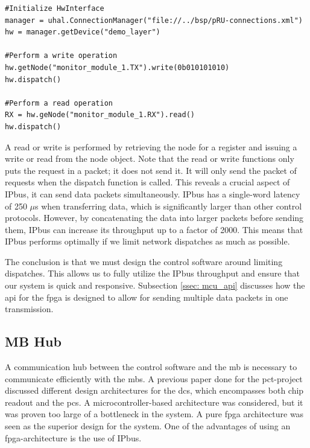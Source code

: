 \documentclass[main.tex]{subfiles}
\begin{document}
\begin{lstlisting}[caption={Example of setting up the HwInterface in python and using it to perform read and write operations.},captionpos=b, label=lst:hwinterface]
#Initialize HwInterface
manager = uhal.ConnectionManager("file://../bsp/pRU-connections.xml")
hw = manager.getDevice("demo_layer")

#Perform a write operation
hw.getNode("monitor_module_1.TX").write(0b010101010)
hw.dispatch()

#Perform a read operation
RX = hw.geNode("monitor_module_1.RX").read()
hw.dispatch()

    \end{lstlisting}



A read or write is performed by retrieving the node for a register and issuing a write or read from the node object. Note that the read or write functions only puts the request in a packet; it does not send it. It will only send the packet of requests when the dispatch function is called. This reveals a crucial aspect of IPbus, it can send data packets simultaneously. IPbus has a single-word latency of 250 $\mu$s when transferring data, which is significantly larger than other control protocols. However, by concatenating the data into larger packets before sending them, IPbus can increase its throughput up to a factor of 2000\cite{IPbus}. This means that IPbus performs optimally if we limit network dispatches as much as possible.

The conclusion is that we must design the control software around limiting dispatches. This allows us to fully utilize the IPbus throughput and ensure that our system is quick and responsive. Subsection \ref{ssec: mcu_api} discusses how the \gls{api} for the \gls{fpga} is designed to allow for sending multiple data packets in one transmission.


\subsection{MB Hub}
\label{section: fpga_design}
A communication hub between the control software and the \gls{mb} is necessary to communicate efficiently with the \gls{mb}s. A previous paper done for the \gls{pct}-project discussed different design architectures for the \gls{dcs}, which encompasses both chip readout and the \gls{pcs}\cite{ola}. A microcontroller-based architecture was considered, but it was proven too large of a bottleneck in the system. A pure \gls{fpga} architecture was seen as the superior design for the system. One of the advantages of using an \gls{fpga}-architecture is the use of IPbus.
\end{document}
